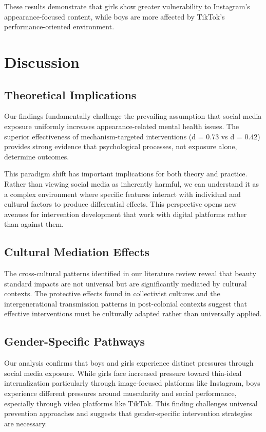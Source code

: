 \documentclass{article}
\begin{document}
These results demonstrate that girls show greater vulnerability to Instagram's appearance-focused content, while boys are more affected by TikTok's performance-oriented environment.

\section{Discussion}

\subsection{Theoretical Implications}

Our findings fundamentally challenge the prevailing assumption that social media exposure uniformly increases appearance-related mental health issues. The superior effectiveness of mechanism-targeted interventions (d = 0.73 vs d = 0.42) provides strong evidence that psychological processes, not exposure alone, determine outcomes.

This paradigm shift has important implications for both theory and practice. Rather than viewing social media as inherently harmful, we can understand it as a complex environment where specific features interact with individual and cultural factors to produce differential effects. This perspective opens new avenues for intervention development that work with digital platforms rather than against them.

\subsection{Cultural Mediation Effects}

The cross-cultural patterns identified in our literature review reveal that beauty standard impacts are not universal but are significantly mediated by cultural contexts. The protective effects found in collectivist cultures \citep{abdoli2025} and the intergenerational transmission patterns in post-colonial contexts \citep{tirona2023} suggest that effective interventions must be culturally adapted rather than universally applied.

\subsection{Gender-Specific Pathways}

Our analysis confirms that boys and girls experience distinct pressures through social media exposure. While girls face increased pressure toward thin-ideal internalization particularly through image-focused platforms like Instagram, boys experience different pressures around muscularity and social performance, especially through video platforms like TikTok. This finding challenges universal prevention approaches and suggests that gender-specific intervention strategies are necessary.
\end{document}
